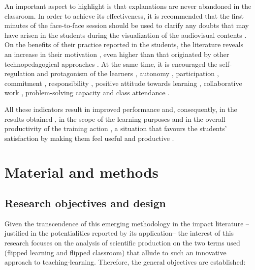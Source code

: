 \documentclass{textolivre-html}
\begin{document}
An important aspect to highlight is that explanations are never abandoned in the classroom. In order to achieve its effectiveness, it is recommended that the first minutes of the face-to-face session should be used to clarify any doubts that may have arisen in the students during the visualization of the audiovisual contents \cite{mok_teaching_2014}.
On the benefits of their practice reported in the students, the literature reveals an increase in their motivation \cite{shih_students_2016,tse_effects_2019}, even higher than that originated by other technopedagogical approaches \cite{thai_impact_2017}. At the same time, it is encouraged the self-regulation and protagonism of the learners \cite{mino-puigcercos_transforming_2018}, autonomy \cite{llanos_garcia_flipped_2019}, participation \cite{chyr_exploring_2017}, commitment \cite{bravo_desarrollo_2019,yilmaz_exploring_2017}, responsibility \cite{huang_investigating_2019}, positive attitude towards learning \cite{lee_what_2018,mcnally_flipped_2017}, collaborative work \cite{baez_perez_mirada_2019,kwon_impact_2018,wu_creating_2017}, problem-solving capacity \cite{daniela_flipped_2019,delozier_flipped_2017} and class attendance \cite{blair_performance_2016,mingorance_estrada_mejora_2017}.

All these indicators result in improved performance \cite{sola_martinez_eficacia_2019} and, consequently, in the results obtained \cite{fisher_flipped_2017,sacristan_san_cristobal_flipped_2017}, in the scope of the learning purposes \cite{awidi_impact_2019,kazanidis_can_2019} and in the overall productivity of the training action \cite{yoshida2016}, a situation that favours the students’ satisfaction by making them feel useful and productive \cite{romero_flipped_2019}.

\section{Material and methods}\label{sec-material}
\subsection{Research objectives and design}\label{sec-research}
Given the transcendence of this emerging methodology in the impact literature –justified in the potentialities reported by its application– the interest of this research focuses on the analysis of scientific production on the two terms used (flipped learning and flipped classroom) that allude to such an innovative approach to teaching-learning. Therefore, the general objectives are established:
\end{document}
